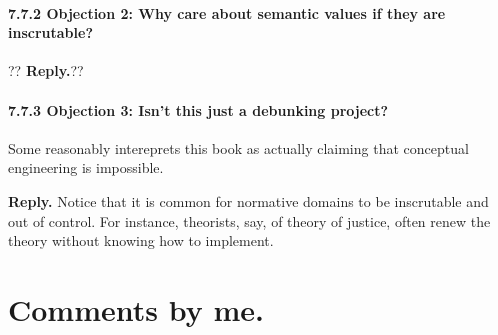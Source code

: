 \documentclass[
10pt, %
a4paper, %
twocolumn, %
landscape %
]{article}
\begin{document}
\paragraph{7.7.2 Objection 2: Why care about semantic values if they are inscrutable?}
??
\noindent \textbf{Reply.}??

\paragraph{7.7.3 Objection 3: Isn't this just a debunking project?}
Some reasonably intereprets this book as actually claiming that conceptual engineering is impossible.

\noindent \textbf{Reply.} Notice that it is common for normative domains to be inscrutable and out of control. For instance, theorists, say, of theory of justice, often renew the theory without knowing how to implement.
\section*{Comments by me.}



\end{document}
